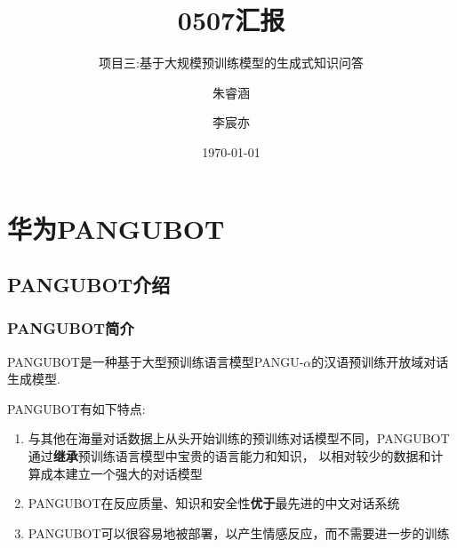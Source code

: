 \documentclass{beamer}
\title{0507汇报}
\subtitle{项目三:基于大规模预训练模型的生成式知识问答}
\author{朱睿涵 \and 李宸亦}
\date{\today}
\begin{document}
\frame{\titlepage} %


\section{华为PANGUBOT}

\subsection{PANGUBOT介绍}
\begin{frame}
    \frametitle{PANGUBOT简介}

    PANGUBOT是一种基于大型预训练语言模型PANGU-$\alpha$的汉语预训练开放域对话生成模型.

    PANGUBOT有如下特点:

    \begin{enumerate}
        \item 与其他在海量对话数据上从头开始训练的预训练对话模型不同，PANGUBOT通过\textbf{继承}预训练语言模型中宝贵的语言能力和知识，
        以相对较少的数据和计算成本建立一个强大的对话模型
        \item PANGUBOT在反应质量、知识和安全性\textbf{优于}最先进的中文对话系统
        \item PANGUBOT可以很容易地被部署，以产生情感反应，而不需要进一步的训练
    \end{enumerate}
\end{frame}
\end{document}
